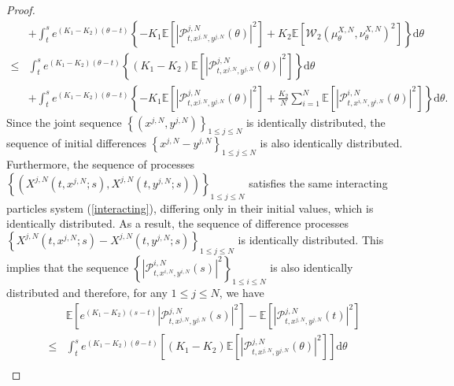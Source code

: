 \documentclass[12pt]{article}
\numberwithin{equation}{section}
\begin{document}
\begin{proof}
\begin{equation}
\begin{aligned}
&+\int_t^s  e^{\left(K_1-K_2\right)\left(\theta-t\right)}\left\{-K_1\mathbb{E}\left[\left|\mathcal{P}^{j,N}_{t, x^{j,N}, y^{j,N}}\left(\theta\right)\right|^{2}\right]+K_2\mathbb{E}\left[\mathcal{W}_2\left(\mu _{\theta}^{X,N},\nu _{\theta}^{X,N}\right)^2\right]\right\}\mathrm{d} \theta\\
\leq & \int_t^s  e^{\left(K_1-K_2\right)\left(\theta-t\right)}\left\{\left(K_1-K_2\right)\mathbb{E}\left[\left|\mathcal{P}^{j,N}_{t, x^{j,N}, y^{j,N}}\left(\theta\right)\right|^{2}\right]\right\}\mathrm{d} \theta\\ 
&+\int_t^s  e^{\left(K_1-K_2\right)\left(\theta-t\right)}\left\{-K_1\mathbb{E}\left[\left|\mathcal{P}^{j,N}_{t, x^{j,N}, y^{j,N}}\left(\theta\right)\right|^{2}\right]+\tfrac{K_2}{N}\sum_{i=1}^N{\mathbb{E} \left[ \left|\mathcal{P}_{t,x^{i,N},y^{i,N}}^{i,N}\left( \theta \right) \right|^2\right]}\right\}\mathrm{d} \theta.
\end{aligned}
\end{equation}
Since the joint sequence $
\left\{ \left( x^{j,N},y^{j,N} \right) \right\} _{1\leq j\leq N}$ is   identically distributed,
the sequence of initial differences $
\left\{  x^{j,N}-y^{j,N}  \right\} _{1\leq j\leq N}$ is also identically distributed. Furthermore, the sequence of processes $\left\{ \left( X^{j,N}\left( t,x^{j,N};s \right) ,X^{j,N}\left( t,y^{j,N};s \right) \right) \right\} _{1\le j\le N}$ satisfies  the same interacting particles system (\ref{interacting}), differing only in their initial values, which is identically distributed. 
As a result, the sequence of difference processes 
 $\left\{ X^{j,N}\left( t,x^{j,N};s \right)-X^{j,N}\left( t,y^{j,N};s \right) \right\} _{1\leq j\leq N}$ is identically distributed. This implies that  the sequence $\left\{ \left|\mathcal{P} _{t,x^{i,N},y^{i,N}}^{i,N}\left( s\right) \right|^2 \right\} _{1 \leq i\leq N}$ is also identically distributed and therefore, for any $1\leq j\leq N$, we have  
\begin{equation}\tag{5.31}\label{4.14}
\begin{aligned}
&\mathbb{E}\left[e^{\left(K_1-K_2\right)\left(s-t\right)}\left|\mathcal{P}^{j,N}_{t, x^{j,N}, y^{j,N}}\left(s\right)\right|^{2}\right]-\mathbb{E}\left[\left|\mathcal{P}^{j,N}_{t, x^{j,N}, y^{j,N}}\left(t\right)\right|^{2}\right] \\
\leq & \int_t^s  e^{\left(K_1-K_2\right)\left(\theta-t\right)}\left[\left(K_1-K_2\right)\mathbb{E}\left[\left|\mathcal{P}^{j,N}_{t, x^{j,N}, y^{j,N}}\left(\theta\right)\right|^{2}\right]\right]\mathrm{d} \theta\\ 

\end{aligned}
\end{equation}
\end{proof}
\end{document}

